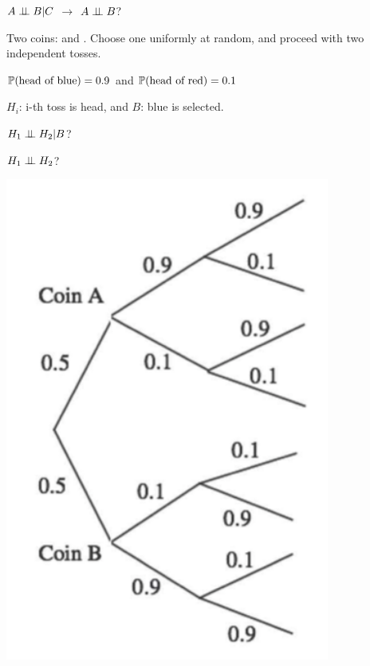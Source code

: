 \documentclass[fleqn,aspectratio=169]{beamer}
\begin{document}
\begin{frame}{ $A \perp \!\!\! \perp B | C$ $\rightarrow$  $A \perp \!\!\! \perp B$?}

{
\small
\plitemsep 0.01in
\bci 


\item<1-> Two coins:  and . Choose one uniformly at random, and proceed with two independent tosses. 

\item<2-> $\mathbb{P}( \text{head of blue} ) = 0.9$ and 
$\mathbb{P}( \text{head of red} ) = 0.1$ 

$H_i$: i-th toss is head, and $B$: blue is selected. 

\item<3-> $H_1 \perp \!\!\! \perp H_2 | B$? 

\item<4-> $H_1 \perp \!\!\! \perp H_2$? 
\abovedisplayskip=-0.01in
\eci 
}
{
\centering
\includegraphics[width=0.8\textwidth]{L2_condind_ex.png}
}


\end{frame}
\end{document}
